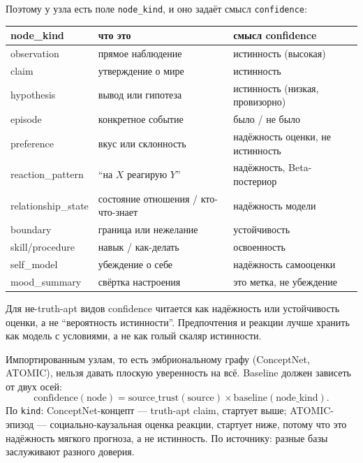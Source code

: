Поэтому у узла есть поле \texttt{node\_kind}, и оно задаёт смысл
\texttt{confidence}:

\begin{center}
\begin{tabular}{p{} p{} p{}}
\toprule
\textbf{node\_kind} & \textbf{что это} & \textbf{смысл confidence} \\
\midrule
observation & прямое наблюдение & истинность (высокая) \\
claim & утверждение о мире & истинность \\
hypothesis & вывод или гипотеза & истинность (низкая, провизорно) \\
episode & конкретное событие & было / не было \\
preference & вкус или склонность & надёжность оценки, не истинность \\
reaction\_pattern & ``на $X$ реагирую $Y$'' & надёжность, Beta-постериор \\
relationship\_state & состояние отношения / кто-что-знает & надёжность модели \\
boundary & граница или нежелание & устойчивость \\
skill/procedure & навык / как-делать & освоенность \\
self\_model & убеждение о себе & надёжность самооценки \\
mood\_summary & свёртка настроения & это метка, не убеждение \\
\bottomrule
\end{tabular}
\end{center}

Для не-truth-apt видов confidence читается как надёжность или устойчивость
оценки, а не ``вероятность истинности''. Предпочтения и реакции лучше хранить
как модель с условиями, а не как голый скаляр истинности.

\begin{principle}[Confidence priors = source\_trust $\times$ kind, а не плоская константа]
Импортированным узлам, то есть эмбриональному графу (ConceptNet, ATOMIC),
нельзя давать плоскую уверенность на всё. Baseline должен зависеть от двух
осей:
\[
\mathrm{confidence}(\mathrm{node}) =
\mathrm{source\_trust}(\mathrm{source}) \times
\mathrm{baseline}(\mathrm{node\_kind}).
\]
По \texttt{kind}: ConceptNet-концепт --- truth-apt claim, стартует выше;
ATOMIC-эпизод --- социально-каузальная оценка реакции, стартует ниже, потому
что это надёжность мягкого прогноза, а не истинность. По источнику: разные
базы заслуживают разного доверия.
\end{principle}


